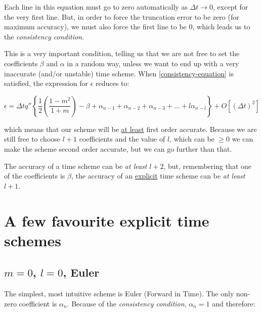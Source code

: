 Each line in this equation must go to zero automatically as $\Delta t \rightarrow 0$, except for the very first line. But, in order to force the truncation error to be zero (for maximum accuracy), we must also force the first line to be $0$, which leads us to the \emph{consistency condition}.

\vspace{1em}

This is a very important condition, telling us that we are not free to set the coefficients $\beta$ and $\alpha$ in a random way, unless we want to end up with a very inaccurate (and/or unstable) time scheme. When \ref{consistency-equation} is satisfied, the expression for $\epsilon$ reduces to:

\begin{equation}
	\epsilon = \Delta t q'' \left\{\frac{1}{2}\left(\frac{1-m^2}{1+m}\right)-\beta  +\alpha_{n-1}+\alpha_{n-2}+\alpha_{n-3}+ ... +l\alpha_{n-l}\right\} +O\left[(\Delta t)^2\right]
	\label{consistency-truncation}
\end{equation}

which means that our scheme will be \underline{at least} first order accurate. Because we are still free to choose $l+1$ coefficients and the value of $l$, which can be $\ge0$ we can make the scheme second order accurate, but we can go further than that.

	\begin{theorem}		
	The accuracy of a time scheme can be \emph{at least} $l+2$, but, remembering that one of the coefficients is $\beta$, the accuracy of an \underline{explicit} time scheme can be \emph{at least} $l+1$.
	\end{theorem} 

\section{A few favourite explicit time schemes}
\subsection{$m=0$, $l=0$, Euler}
The simplest, most intuitive scheme is Euler (Forward in Time). The only non-zero coefficient is $\alpha_n$. Because of the \emph{consistency condition}, $\alpha_n=1$ and therefore:

